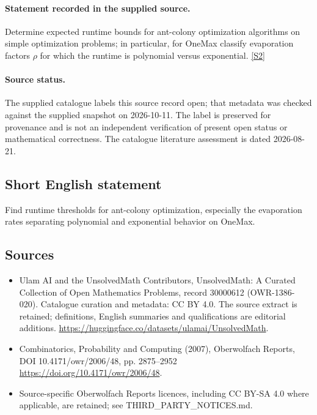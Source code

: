\documentclass[11pt]{article}
\begin{document}
\paragraph{Statement recorded in the supplied source.}
Determine expected runtime bounds for ant-colony optimization algorithms on simple optimization problems; in particular, for OneMax classify evaporation factors $\rho$ for which the runtime is polynomial versus exponential. \href{https://doi.org/10.4171/owr/2006/48}{[S2]}
\paragraph{Source status.}
The supplied catalogue labels this source record open; that metadata was checked against the supplied snapshot on 2026-10-11. The label is preserved for provenance and is not an independent verification of present open status or mathematical correctness. The catalogue literature assessment is dated 2026-08-21.
\subsection{Short English statement}
Find runtime thresholds for ant-colony optimization, especially the evaporation rates separating polynomial and exponential behavior on OneMax.
\subsection{Sources}
\begin{itemize}
\item[S1] Ulam AI and the UnsolvedMath Contributors, UnsolvedMath: A Curated Collection of Open Mathematics Problems, record 30000612 (OWR-1386-020). Catalogue curation and metadata: CC BY 4.0. The source extract is retained; definitions, English summaries and qualifications are editorial additions.
\url{https://huggingface.co/datasets/ulamai/UnsolvedMath}.
\item[S2] Combinatorics, Probability and Computing (2007), Oberwolfach Reports, DOI 10.4171/owr/2006/48, pp. 2875--2952
\url{https://doi.org/10.4171/owr/2006/48}.
\item Source-specific Oberwolfach Reports licences, including CC BY-SA 4.0 where applicable, are retained; see THIRD\_PARTY\_NOTICES.md.
\end{itemize}
\end{document}
